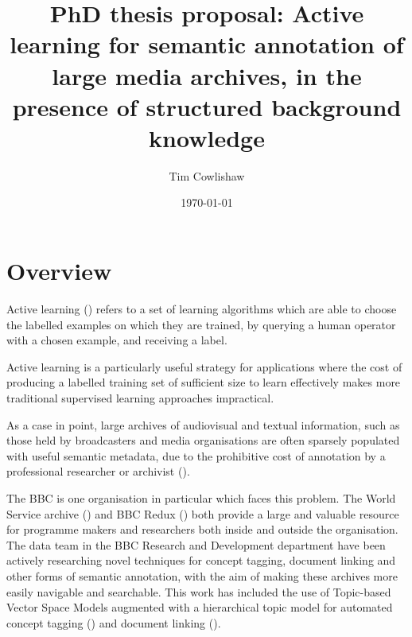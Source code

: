 \documentclass[a4paper, 11pt]{article}
\title{PhD thesis proposal: Active learning for semantic annotation of large media archives, in the presence of structured background knowledge}
\author{Tim Cowlishaw}
\date{\today}
\begin{document}
\maketitle
\section{Overview}
\begin{comment}
  Related challenges
     - Information retrieval
     - Topic extraction (and ontology relationship detection)
     - Named entity recognition
     - Word-sense disambiguation
     - Feature selection for active learning.

  Lines of enquiry
  - Suitable models
  - Suitable query strategies and error / uncertainty measures
  - Methods of incorporating outside knowledge
  - Feature selection for AL on broadcast archives
  - Methods of incorporating visual / audible features, or feeding back into transcription process

  Evaluation of existing algorithms and models in broadcast archive setting.
  Improvement of existing results by incorporating structured background knowledge
  Investigation of Human Computer Interaction and IR challenges related to active learning
\end{comment}
Active learning (\cite{Settles2010}) refers to a set of learning algorithms which are able to choose the labelled examples on which they are trained, by querying a human operator with a chosen example, and receiving a label.

Active learning is a particularly useful strategy for applications where the cost of producing a labelled training set of sufficient size to learn effectively makes more traditional supervised learning approaches impractical.

As a case in point, large archives of audiovisual and textual information, such as those held by broadcasters and media organisations are often sparsely populated with useful semantic metadata, due to the prohibitive cost of annotation by a professional researcher or archivist (\cite{Raimond}).

The BBC is one organisation in particular which faces this problem. The World Service archive (\cite{Raimond}) and BBC Redux (\cite{Butterworth2008}) both provide a large and valuable resource for programme makers and researchers both inside and outside the organisation. The data team in the BBC Research and Development department have been actively researching novel techniques for concept tagging, document linking and other forms of semantic annotation, with the aim of making these archives more easily navigable and searchable. This work has included the use of Topic-based Vector Space Models augmented with a hierarchical topic model for automated concept tagging (\cite{Raimond2012}) and document linking (\cite{Raimond2013}).
\end{document}
